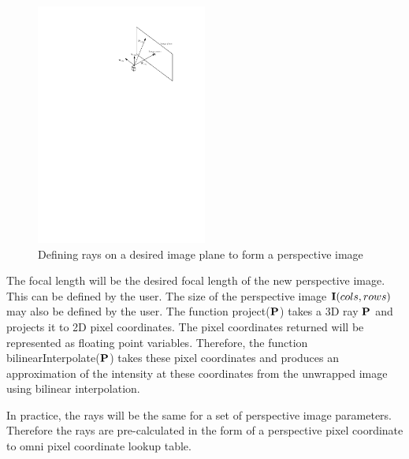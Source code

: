 \begin{figure}[h!]
  \centering
    \includegraphics[width=0.5\textwidth]{chapters/images/omni_perspective}
  \caption{Defining rays on a desired image plane to form a perspective image}
  \label{fig:omni_perspective}
\end{figure}

The focal length will be the desired focal length of the new perspective image. This can be defined by the user.  The size of the perspective image $\mathbf I(cols, rows)$ may also be defined by the user.  The function project($\mathbf P$) takes a 3D ray $\mathbf P$ and projects it to 2D pixel coordinates.  The pixel coordinates returned will be represented as floating point variables.  Therefore, the function bilinearInterpolate($\mathbf P$) takes these pixel coordinates and produces an approximation of the intensity at these coordinates from the unwrapped image using bilinear interpolation.

In practice, the rays will be the same for a set of perspective image parameters.  Therefore the rays are pre-calculated in the form of a perspective pixel coordinate to omni pixel coordinate lookup table.

